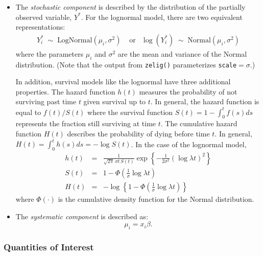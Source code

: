 \begin{itemize}
\item The \emph{stochastic component} is described by the distribution
  of the partially observed variable, $Y^*$.  For the lognormal model,
there are two equivalent representations:  
  \begin{eqnarray*}
    Y_i^* \; \sim \; \textrm{LogNormal}(\mu_i, \sigma^2) & \textrm{ or
} & \log(Y_i^*) \; \sim \; \textrm{Normal}(\mu_i, \sigma^2)
\end{eqnarray*}
where the parameters $\mu_i$ and $\sigma^2$ are the mean and variance
of the Normal distribution. (Note that the output from {\tt zelig()}
parameterizes {\tt scale}$ = \sigma$.)

 In addition, survival models like the lognormal have three additional
properties. The hazard function $h(t)$ measures the probability of not surviving
  past time $t$ given survival up to $t$. In general, the hazard
  function is equal to $f(t)/S(t)$ where the survival function $S(t) =
  1 - \int_{0}^t f(s) ds$ represents the fraction still surviving at
  time $t$.  The cumulative hazard function $H(t)$ describes the
  probability of dying before time $t$.  In general, $H(t)=
\int_{0}^{t} h(s) ds = -\log S(t)$. In the case of the lognormal model, 
\begin{eqnarray*}
h(t) &=& \frac{1}{\sqrt{2 \pi} \, \sigma t \, S(t)}
\exp\left\{-\frac{1}{2 \sigma^2} (\log \lambda t)^2\right\} \\
S(t) &=& 1 - \Phi\left(\frac{1}{\sigma} \log \lambda t\right) \\
H(t) &=& -\log \left\{ 1 - \Phi\left(\frac{1}{\sigma} \log \lambda t\right) \right\}
\end{eqnarray*}
where $\Phi(\cdot)$ is the cumulative density function for the Normal
distribution.  

\item The \emph{systematic component} is described as: 
\begin{equation*}
\mu_i = x_i \beta .
\end{equation*}

\end{itemize}

\subsubsection{Quantities of Interest} 

